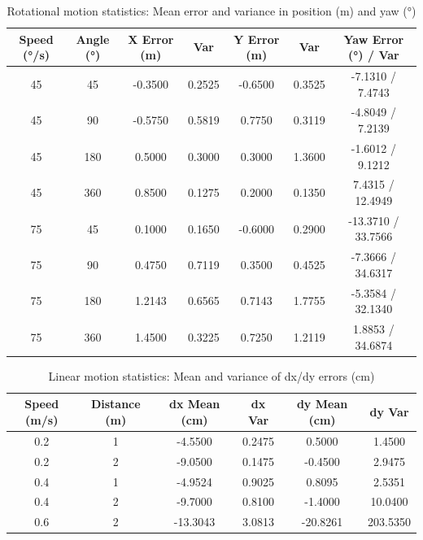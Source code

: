 \documentclass[a4paper, 12pt]{article}
\newif\ifshownotes
\newcommand{\notes}[1]{\ifshownotes\textcolor{blue}{#1}\fi}
\begin{document}
    \notes{insert diagram here showing how that is done}

    \begin{table}[H]
    \centering
    \begin{tabular}{|c|c|c|c|c|c|c|}
    \hline
    \textbf{Speed (°/s)} & \textbf{Angle (°)} & \textbf{X Error (m)} & \textbf{Var} & \textbf{Y Error (m)} & \textbf{Var} & \textbf{Yaw Error (°)} / Var \\
    \hline
    45 & 45  & -0.3500 & 0.2525 & -0.6500 & 0.3525 & -7.1310 / 7.4743 \\
    45 & 90  & -0.5750 & 0.5819 &  0.7750 & 0.3119 & -4.8049 / 7.2139 \\
    45 & 180 &  0.5000 & 0.3000 &  0.3000 & 1.3600 & -1.6012 / 9.1212 \\
    45 & 360 &  0.8500 & 0.1275 &  0.2000 & 0.1350 &  7.4315 / 12.4949 \\
    75 & 45  &  0.1000 & 0.1650 & -0.6000 & 0.2900 & -13.3710 / 33.7566 \\
    75 & 90  &  0.4750 & 0.7119 &  0.3500 & 0.4525 & -7.3666 / 34.6317 \\
    75 & 180 &  1.2143 & 0.6565 &  0.7143 & 1.7755 & -5.3584 / 32.1340 \\
    75 & 360 &  1.4500 & 0.3225 &  0.7250 & 1.2119 &  1.8853 / 34.6874 \\
    \hline
    \end{tabular}
    \caption{Rotational motion statistics: Mean error and variance in position (m) and yaw (°)}
    \end{table}

    \begin{table}[H]
    \centering
    \begin{tabular}{|c|c|c|c|c|c|}
    \hline
    \textbf{Speed (m/s)} & \textbf{Distance (m)} & \textbf{dx Mean (cm)} & \textbf{dx Var} & \textbf{dy Mean (cm)} & \textbf{dy Var} \\
    \hline
    0.2 & 1 & -4.5500 & 0.2475 &  0.5000 & 1.4500 \\
    0.2 & 2 & -9.0500 & 0.1475 & -0.4500 & 2.9475 \\
    0.4 & 1 & -4.9524 & 0.9025 &  0.8095 & 2.5351 \\
    0.4 & 2 & -9.7000 & 0.8100 & -1.4000 & 10.0400 \\
    0.6 & 2 & -13.3043 & 3.0813 & -20.8261 & 203.5350 \\
    \hline
    \end{tabular}
    \caption{Linear motion statistics: Mean and variance of dx/dy errors (cm)}
    \end{table}
\end{document}
